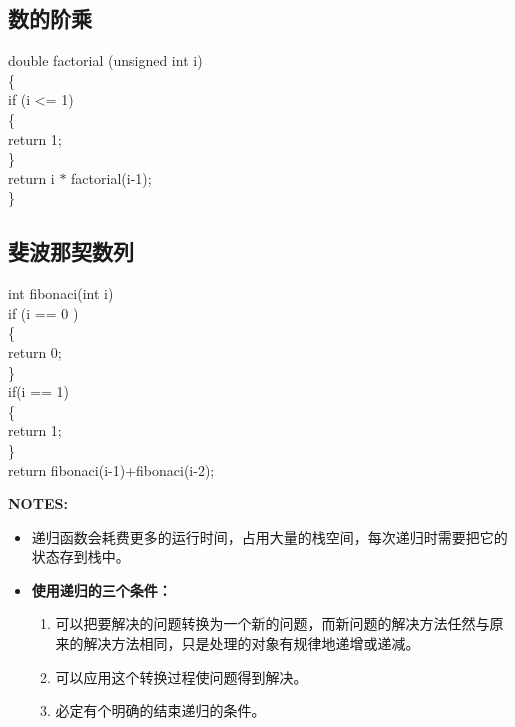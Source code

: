 \documentclass[UTF8]{ctexart}
\begin{document}
			\subsection{数的阶乘}
			\begin{framed}
				double factorial (unsigned int i)\\
				\{\\
					if (i <= 1)\\
					\{\\
						return 1;\\	
					\}\\
					return i $*$ factorial(i-1);\\
				\}\\
			\end{framed}
			\subsection{斐波那契数列}
			\begin{framed}
				int fibonaci(int i)\\
				if (i == 0 )\\
				\{\\
					return 0;\\
				\}\\
				if(i == 1)\\
				\{\\
					return 1;\\
				\}\\
				return fibonaci(i-1)+fibonaci(i-2);\\
			\end{framed}
			\begin{framed}
				\textbf{NOTES:}\\
				\begin{itemize}
					\item 递归函数会耗费更多的运行时间，占用大量的栈空间，每次递归时需要把它的状态存到栈中。
					\item \textbf{使用递归的三个条件：}\begin{enumerate}
						\item 可以把要解决的问题转换为一个新的问题，而新问题的解决方法任然与原来的解决方法相同，只是处理的对象有规律地递增或递减。
						\item 可以应用这个转换过程使问题得到解决。
						\item 必定有个明确的结束递归的条件。
					\end{enumerate}
				\end{itemize}
			\end{framed}
			
\end{document}
